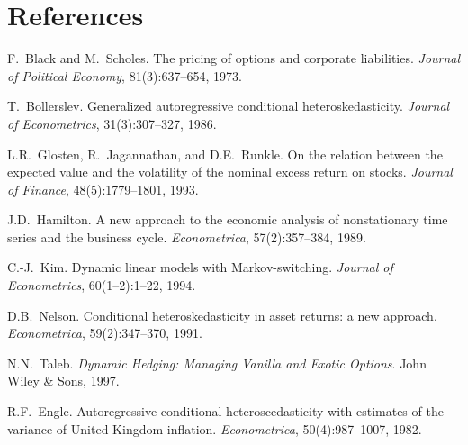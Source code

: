 \documentclass[11pt,a4paper]{article}
\begin{document}
\section*{References}

\begin{enumerate}[label={[\arabic*]}, nosep, leftmargin=2em]
\item F.~Black and M.~Scholes. The pricing of options and corporate liabilities. \textit{Journal of Political Economy}, 81(3):637--654, 1973.
\item T.~Bollerslev. Generalized autoregressive conditional heteroskedasticity. \textit{Journal of Econometrics}, 31(3):307--327, 1986.
\item L.R.~Glosten, R.~Jagannathan, and D.E.~Runkle. On the relation between the expected value and the volatility of the nominal excess return on stocks. \textit{Journal of Finance}, 48(5):1779--1801, 1993.
\item J.D.~Hamilton. A new approach to the economic analysis of nonstationary time series and the business cycle. \textit{Econometrica}, 57(2):357--384, 1989.
\item C.-J.~Kim. Dynamic linear models with Markov-switching. \textit{Journal of Econometrics}, 60(1--2):1--22, 1994.
\item D.B.~Nelson. Conditional heteroskedasticity in asset returns: a new approach. \textit{Econometrica}, 59(2):347--370, 1991.
\item N.N.~Taleb. \textit{Dynamic Hedging: Managing Vanilla and Exotic Options}. John Wiley \& Sons, 1997.
\item R.F.~Engle. Autoregressive conditional heteroscedasticity with estimates of the variance of United Kingdom inflation. \textit{Econometrica}, 50(4):987--1007, 1982.
\end{enumerate}
\end{document}
